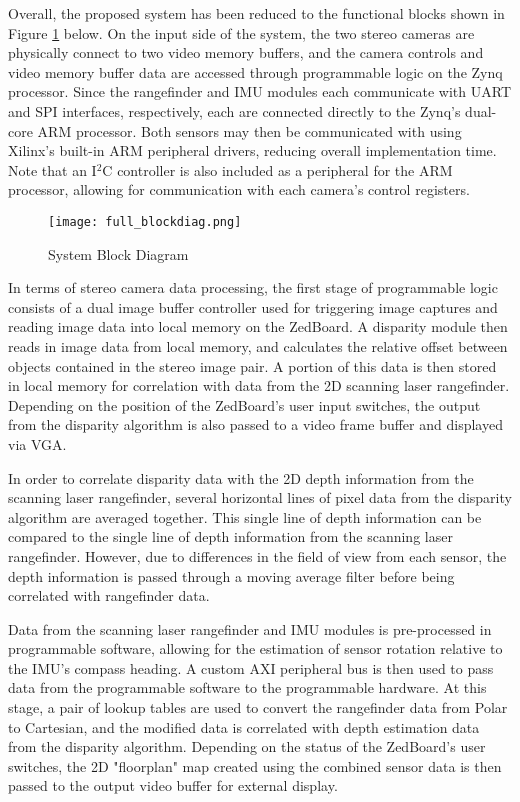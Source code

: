Overall, the proposed system has been reduced to the functional blocks shown in Figure \ref{systemBD} below. On the input side of the system, the two stereo cameras are physically connect to two video memory buffers, and the camera controls and video memory buffer data are accessed through programmable logic on the Zynq processor.  Since the rangefinder and IMU modules each communicate with UART and SPI interfaces, respectively, each are connected directly to the Zynq's dual-core ARM processor. Both sensors may then be communicated with using Xilinx's built-in ARM peripheral drivers, reducing overall implementation time. Note that an I$^2$C controller is also included as a peripheral for the ARM processor, allowing for communication with each camera's control registers. 
\par
\begin{figure}[H] 
	\centerline{
	\texttt{[image: full\_blockdiag.png]}
	}
	\caption{System Block Diagram}
	\label{systemBD}
\end{figure}
\par
In terms of stereo camera data processing, the first stage of programmable logic consists of a dual image buffer controller used for triggering image captures and reading image data into local memory on the ZedBoard. A disparity module then reads in image data from local memory, and calculates the relative offset between objects contained in the stereo image pair. A portion of this data is then stored in local memory for correlation with data from the 2D scanning laser rangefinder. Depending on the position of the ZedBoard's user input switches, the output from the disparity algorithm is also passed to a video frame buffer and displayed via VGA. 
\par
In order to correlate disparity data with the 2D depth information from the scanning laser rangefinder, several horizontal lines of pixel data from the disparity algorithm are averaged together. This single line of depth information can be compared to the single line of depth information from the scanning laser rangefinder. However, due to differences in the field of view from each sensor, the depth information is passed through a moving average filter before being correlated with rangefinder data. 
\par
Data from the scanning laser rangefinder and IMU modules is pre-processed in programmable software, allowing for the estimation of sensor rotation relative to the IMU's compass heading.  A custom AXI peripheral bus is then used to pass data from the programmable software to the programmable hardware. At this stage, a pair of lookup tables are used to convert the rangefinder data from Polar to Cartesian, and the modified data is correlated with depth estimation data from the disparity algorithm. Depending on the status of the ZedBoard's user switches, the 2D "floorplan" map created using the combined sensor data is then passed to the output video buffer for external display. 